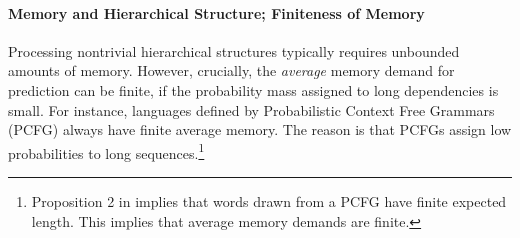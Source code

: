 
\paragraph{Memory and Hierarchical Structure; Finiteness of Memory}
Processing nontrivial hierarchical structures typically requires unbounded amounts of memory.
However, crucially, the \emph{average} memory demand for prediction can be finite, if the probability mass assigned to long dependencies is small.
For instance, languages defined by Probabilistic Context Free Grammars (PCFG) always have finite average memory.
The reason is that PCFGs assign low probabilities to long sequences.\footnote{Proposition 2 in \cite{chi-statistical-1999} implies that words drawn from a PCFG have finite expected length. This implies that average memory demands are finite.}








